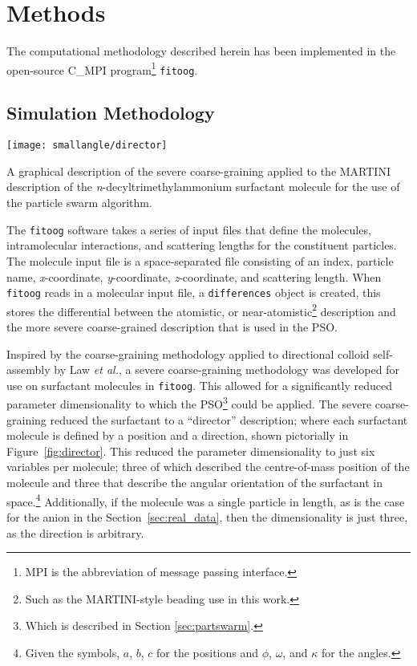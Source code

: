 \section{Methods}
The computational methodology described herein has been implemented in the open-source C\_MPI program\footnote{MPI is the abbreviation of message passing interface.} \texttt{fitoog}.

\subsection{Simulation Methodology}
%
\begin{marginfigure}
    \centering
    \texttt{[image: smallangle/director]}
    \caption{A graphical description of the severe coarse-graining applied to the MARTINI description of the \emph{n}-decyltrimethylammonium surfactant molecule for the use of the particle swarm algorithm.}
    \label{fig:director}
\end{marginfigure}
%
The \texttt{fitoog} software takes a series of input files that define the molecules, intramolecular interactions, and scattering lengths for the constituent particles.
The molecule input file is a space-separated file consisting of an index, particle name, \emph{x}-coordinate, \emph{y}-coordinate, \emph{z}-coordinate, and scattering length.
When \texttt{fitoog} reads in a molecular input file, a \texttt{differences} object is created, this stores the differential between the atomistic, or near-atomistic\footnote{Such as the MARTINI-style beading use in this work.} description and the more severe coarse-grained description that is used in the PSO.

Inspired by the coarse-graining methodology applied to directional colloid self-assembly by Law \emph{et al.}, a severe coarse-graining methodology was developed for use on surfactant molecules in \texttt{fitoog}.
This allowed for a significantly reduced parameter dimensionality to which the PSO\footnote{Which is described in Section \ref{sec:partswarm}.} could be applied.
The severe coarse-graining reduced the surfactant to a ``director'' description; where each surfactant molecule is defined by a position and a direction, shown pictorially in Figure~\ref{fig:director}.
This reduced the parameter dimensionality to just six variables per molecule; three of which described the centre-of-mass position of the molecule and three that describe the angular orientation of the surfactant in space.\footnote{Given the symbols, $a$, $b$, $c$ for the positions and $\phi$, $\omega$, and $\kappa$ for the angles.}
Additionally, if the molecule was a single particle in length, as is the case for the  anion in the Section~\ref{sec:real_data}, then the dimensionality is just three, as the direction is arbitrary.

